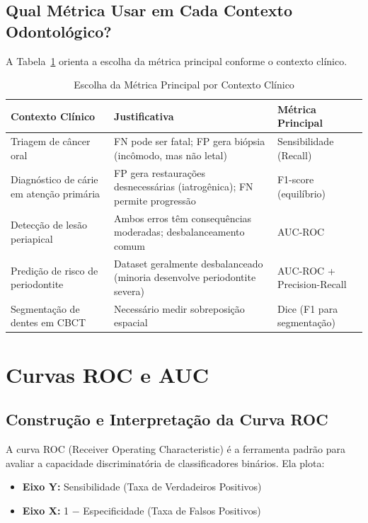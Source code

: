 \subsection{Qual Métrica Usar em Cada Contexto Odontológico?}

A Tabela~\ref{tab:metricas-contexto} orienta a escolha da métrica principal conforme o contexto clínico.

\begin{table}[H]
  \centering
  \caption{Escolha da Métrica Principal por Contexto Clínico}
  \label{tab:metricas-contexto}
  \begin{tabularx}{\textwidth}{p{3.5cm}Xp{2.5cm}}
    \toprule
    \textbf{Contexto Clínico} & \textbf{Justificativa} & \textbf{Métrica Principal} \\
    \midrule
    Triagem de câncer oral & FN pode ser fatal; FP gera biópsia (incômodo, mas não letal) & Sensibilidade (Recall) \\
    Diagnóstico de cárie em atenção primária & FP gera restaurações desnecessárias (iatrogênica); FN permite progressão & F1-score (equilíbrio) \\
    Detecção de lesão periapical & Ambos erros têm consequências moderadas; desbalanceamento comum & AUC-ROC \\
    Predição de risco de periodontite & Dataset geralmente desbalanceado (minoria desenvolve periodontite severa) & AUC-ROC + Precision-Recall \\
    Segmentação de dentes em CBCT & Necessário medir sobreposição espacial & Dice (F1 para segmentação) \\
    \bottomrule
  \end{tabularx}
\end{table}

\section{Curvas ROC e AUC}

\subsection{Construção e Interpretação da Curva ROC}

A curva ROC (Receiver Operating Characteristic)  é a ferramenta padrão para avaliar a capacidade discriminatória de classificadores binários. Ela plota:

\begin{itemize}
    \item \textbf{Eixo Y:} Sensibilidade (Taxa de Verdadeiros Positivos)
    \item \textbf{Eixo X:} 1 $-$ Especificidade (Taxa de Falsos Positivos)
\end{itemize}

